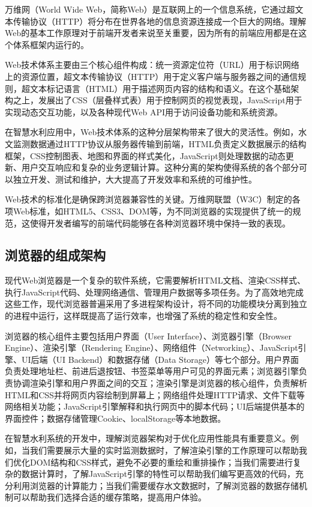 万维网（World Wide Web，简称Web）是互联网上的一个信息系统，它通过超文本传输协议（HTTP）将分布在世界各地的信息资源连接成一个巨大的网络。理解Web的基本工作原理对于前端开发者来说至关重要，因为所有的前端应用都是在这个体系框架内运行的。

Web技术体系主要由三个核心组件构成：统一资源定位符（URL）用于标识网络上的资源位置，超文本传输协议（HTTP）用于定义客户端与服务器之间的通信规则，超文本标记语言（HTML）用于描述网页内容的结构和语义。在这个基础架构之上，发展出了CSS（层叠样式表）用于控制网页的视觉表现，JavaScript用于实现动态交互功能，以及各种现代Web API用于访问设备功能和系统资源。

在智慧水利应用中，Web技术体系的这种分层架构带来了很大的灵活性。例如，水文监测数据通过HTTP协议从服务器传输到前端，HTML负责定义数据展示的结构框架，CSS控制图表、地图和界面的样式美化，JavaScript则处理数据的动态更新、用户交互响应和复杂的业务逻辑计算。这种分离的架构使得系统的各个部分可以独立开发、测试和维护，大大提高了开发效率和系统的可维护性。

 Web技术的标准化是确保跨浏览器兼容性的关键。万维网联盟（W3C）制定的各项Web标准，如HTML5、CSS3、DOM等，为不同浏览器的实现提供了统一的规范，这使得开发者编写的前端代码能够在各种浏览器环境中保持一致的表现。

\hypertarget{ux6d4fux89c8ux5668ux7684ux7ec4ux6210ux67b6ux6784}{%
\subsection{浏览器的组成架构}\label{ux6d4fux89c8ux5668ux7684ux7ec4ux6210ux67b6ux6784}}

现代Web浏览器是一个复杂的软件系统，它需要解析HTML文档、渲染CSS样式、执行JavaScript代码、处理网络通信、管理用户数据等多项任务。为了高效地完成这些工作，现代浏览器普遍采用了多进程架构设计，将不同的功能模块分离到独立的进程中运行，这样既提高了运行效率，也增强了系统的稳定性和安全性。

浏览器的核心组件主要包括用户界面（User Interface）、浏览器引擎（Browser Engine）、渲染引擎（Rendering Engine）、网络组件（Networking）、JavaScript引擎、UI后端（UI Backend）和数据存储（Data Storage）等七个部分。用户界面负责处理地址栏、前进后退按钮、书签菜单等用户可见的界面元素；浏览器引擎负责协调渲染引擎和用户界面之间的交互；渲染引擎是浏览器的核心组件，负责解析HTML和CSS并将网页内容绘制到屏幕上；网络组件处理HTTP请求、文件下载等网络相关功能；JavaScript引擎解释和执行网页中的脚本代码；UI后端提供基本的界面控件；数据存储管理Cookie、localStorage等本地数据。

在智慧水利系统的开发中，理解浏览器架构对于优化应用性能具有重要意义。例如，当我们需要展示大量的实时监测数据时，了解渲染引擎的工作原理可以帮助我们优化DOM结构和CSS样式，避免不必要的重绘和重排操作；当我们需要进行复杂的数据计算时，了解JavaScript引擎的特性可以帮助我们编写更高效的代码，充分利用浏览器的计算能力；当我们需要缓存水文数据时，了解浏览器的数据存储机制可以帮助我们选择合适的缓存策略，提高用户体验。

